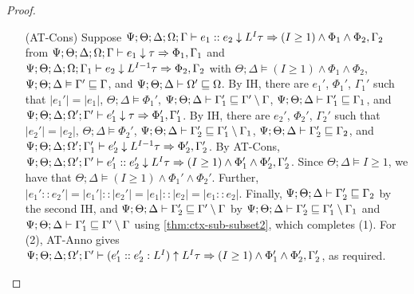 \begin{proof}
\begin{itemize}
  \item[(AT-Cons)] Suppose $\Psi ; \Theta ; \Delta ; \Omega ; \Gamma\vdash e_1 :: e_2 \downarrow L^I \tau \Rightarrow (I \geq 1) \wedge \Phi_1 \wedge \Phi_2, \Gamma_2$
  from $\Psi ; \Theta ; \Delta ; \Omega ; \Gamma\vdash e_1 \downarrow \tau \Rightarrow \Phi_1, \Gamma_1$ and 
       $\Psi ; \Theta ; \Delta ; \Omega ; \Gamma_1\vdash e_2 \downarrow L^{I-1} \tau \Rightarrow \Phi_2, \Gamma_2$ with 
       $\Theta ; \Delta \vDash (I \geq 1) \wedge \Phi_1 \wedge \Phi_2$, 
       $\Psi ; \Theta ; \Delta \vDash \Gamma' \sqsubseteq \Gamma$, and 
       $\Psi ; \Theta ; \Delta \vdash \Omega' \sqsubseteq \Omega$.
       By IH, there are $e_1'$, $\Phi_1'$, $\Gamma_1'$ such that $|e_1'| = |e_1|$, 
       $\Theta ; \Delta \vDash \Phi_1'$, 
       $\Psi ; \Theta ; \Delta \vdash \Gamma_1' \sqsubseteq \Gamma' \setminus \Gamma$, 
       $\Psi ; \Theta ; \Delta \vdash \Gamma_1' \sqsubseteq \Gamma_1$, and
       $\Psi ; \Theta ; \Delta ; \Omega' ; \Gamma' \vdash e_1' \downarrow \tau \Rightarrow \Phi_1',\Gamma_1'$.
       By IH, there are $e_2'$, $\Phi_2'$, $\Gamma_2'$ such that $|e_2'| = |e_2|$,
       $\Theta ; \Delta \vDash \Phi_2'$,
       $\Psi ; \Theta ; \Delta \vdash \Gamma_2' \sqsubseteq \Gamma_1' \setminus \Gamma_1$,
       $\Psi ; \Theta ; \Delta \vdash \Gamma_2' \sqsubseteq \Gamma_2$, and
       $\Psi ; \Theta ; \Delta ; \Omega' ; \Gamma_1' \vdash e_2' \downarrow L^{I-1} \tau \Rightarrow \Phi_2',\Gamma_2'$.
       By AT-Cons,
       $\Psi ; \Theta ; \Delta ; \Omega' ; \Gamma' \vdash e_1' :: e_2' \downarrow L^I \tau \Rightarrow (I \geq 1) \wedge \Phi_1' \wedge \Phi_2',\Gamma_2'$.
       Since $\Theta ; \Delta \vDash I \geq 1$, we have that $\Theta ; \Delta \vDash (I \geq 1) \wedge \Phi_1' \wedge \Phi_2'$. Further, $|e_1' :: e_2'| = |e_1'| :: |e_2'| = |e_1| :: |e_2| = |e_1 :: e_2|$. Finally, $\Psi ; \Theta ; \Delta \vdash \Gamma_2' \sqsubseteq \Gamma_2$ by the second IH, and $\Psi ; \Theta ; \Delta \vdash \Gamma_2' \sqsubseteq \Gamma' \setminus \Gamma$ by $\Psi ; \Theta ; \Delta \vdash \Gamma_2' \sqsubseteq \Gamma_1' \setminus \Gamma_1$ and $\Psi ; \Theta ; \Delta \vdash \Gamma_1' \sqsubseteq \Gamma' \setminus \Gamma$ using \autoref{thm:ctx-sub-subset2}, which completes (1). For (2), AT-Anno gives
       $\Psi ; \Theta ; \Delta ; \Omega' ; \Gamma' \vdash (e_1' :: e_2' : L^I) \uparrow L^I \tau \Rightarrow (I \geq 1) \wedge \Phi_1' \wedge \Phi_2',\Gamma_2'$, as required.
  

\end{itemize}
\end{proof}
